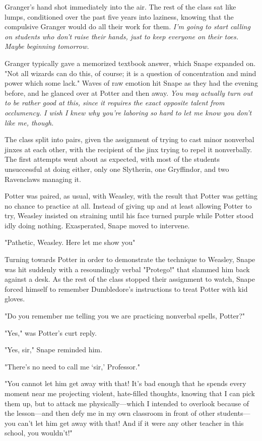 Granger's hand shot immediately into the air. The rest of the class sat like lumps, conditioned over the past five years into laziness, knowing that the compulsive Granger would do all their work for them. \emph{I'm going to start calling on students who don't raise their hands, just to keep everyone on their toes. Maybe beginning tomorrow.}

Granger typically gave a memorized textbook answer, which Snape expanded on. "Not all wizards can do this, of course; it is a question of concentration and mind power which some lack." Waves of raw emotion hit Snape as they had the evening before, and he glanced over at Potter and then away. \emph{You may actually turn out to be rather good at this, since it requires the exact opposite talent from occlumency. I wish I knew why you're laboring so hard to let me know you don't like me, though.}

The class split into pairs, given the assignment of trying to cast minor nonverbal jinxes at each other, with the recipient of the jinx trying to repel it nonverbally. The first attempts went about as expected, with most of the students unsuccessful at doing either, only one Slytherin, one Gryffindor, and two Ravenclaws managing it.

Potter was paired, as usual, with Weasley, with the result that Potter was getting no chance to practice at all. Instead of giving up and at least allowing Potter to try, Weasley insisted on straining until his face turned purple while Potter stood idly doing nothing. Exasperated, Snape moved to intervene.

"Pathetic, Weasley. Here{\el} let me show you{\el}"

Turning towards Potter in order to demonstrate the technique to Weasley, Snape was hit suddenly with a resoundingly verbal "Protego!" that slammed him back against a desk. As the rest of the class stopped their assignment to watch, Snape forced himself to remember Dumbledore's instructions to treat Potter with kid gloves.

"Do you remember me telling you we are practicing nonverbal spells, Potter?"

"Yes," was Potter's curt reply.

"Yes, sir," Snape reminded him.

"There's no need to call me `sir,' Professor."

\sbreak

"You cannot let him get away with that! It's bad enough that he spends every moment near me projecting violent, hate-filled thoughts, knowing that I can pick them up, but to attack me physically—which I intended to overlook because of the lesson—and then defy me in my own classroom in front of other students—you can't let him get away with that! And if it were any other teacher in this school, you wouldn't!"

